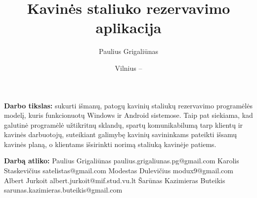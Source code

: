 \documentclass{VUMIFPSkursinis}
\title{Kavinės staliuko rezervavimo aplikacija}
\author{Paulius Grigaliūnas}
\date{Vilnius – \the\year}
\begin{document}
	
\maketitle
\cleardoublepage{}
\setcounter{page}{2}



{\bfseries Darbo tikslas:} sukurti išmanų, patogų kavinių staliukų rezervavimo programėlės modelį, kuris funkcionuotų Windows ir Android sistemose. Taip pat siekiama, kad galutinė programėlė užtikritnų sklandų, spartų komunikabilumą tarp klientų ir kavinės darbuotojų, suteikiant galimybę kavinių savininkams pateikti išsamų kavinės planą, o klientams išsirinkti norimą staliuką kavinėje patiems. 
\newline
\newline
\newline


{\bfseries Darbą atliko:}
\newline
\newline
\newline
Paulius Grigaliūnas
\newline
paulius.grigaliunas.pg@gmail.com
\newline
\newline
\newline
Karolis Staskevičius
\newline
satelistas@gmail.com
\newline
\newline
\newline
Modestas Dulevičius
\newline
modux9@gmail.com
\newline
\newline
\newline
Albert Jurkoit
\newline
albert.jurkoit@mif.stud.vu.lt
\newline
\newline
\newline
Šarūnas Kazimieras Buteikis
\newline
sarunas.kazimieras.buteikis@gmail.com


\tableofcontents

\end{document}
